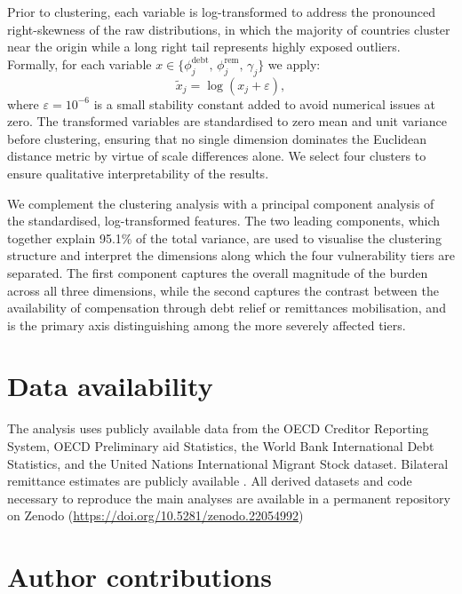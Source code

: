 \documentclass[fleqn,10pt,twocolumn]{wlscirep}
\begin{document}
Prior to clustering, each variable is log-transformed to address the pronounced right-skewness of the raw distributions, in which the majority of countries cluster near the origin while a long right tail represents highly exposed outliers. Formally, for each variable $x \in \{\phi_j^{\text{debt}},\, \phi_j^{\text{rem}},\, \gamma_j\}$ we apply:
\begin{equation}
    \tilde{x}_j = \log(x_j + \varepsilon),
    \label{eq:log_transform}
\end{equation}
where $\varepsilon = 10^{-6}$ is a small stability constant added to avoid numerical issues at zero. The transformed variables are standardised to zero mean and unit variance before clustering, ensuring that no single dimension dominates the Euclidean distance metric by virtue of scale differences alone. We select four clusters to ensure qualitative interpretability of the results. 

We complement the clustering analysis with a principal component analysis of the standardised, log-transformed features. The two leading components, which together explain 95.1\% of the total variance, are used to visualise the clustering structure and interpret the dimensions along which the four vulnerability tiers are separated. The first component captures the overall magnitude of the burden across all three dimensions, while the second captures the contrast between the availability of compensation through debt relief or remittances mobilisation, and is the primary axis distinguishing among the more severely affected tiers.

\section*{Data availability}

The analysis uses publicly available data from the OECD Creditor Reporting System, OECD Preliminary aid Statistics, the World Bank International Debt Statistics, and the United Nations International Migrant Stock dataset. Bilateral remittance estimates are publicly available \cite{vismara2025migrants}. All derived datasets and code necessary to reproduce the main analyses are available in a permanent repository on Zenodo (\url{https://doi.org/10.5281/zenodo.22054992})

\section*{Author contributions}
\end{document}
